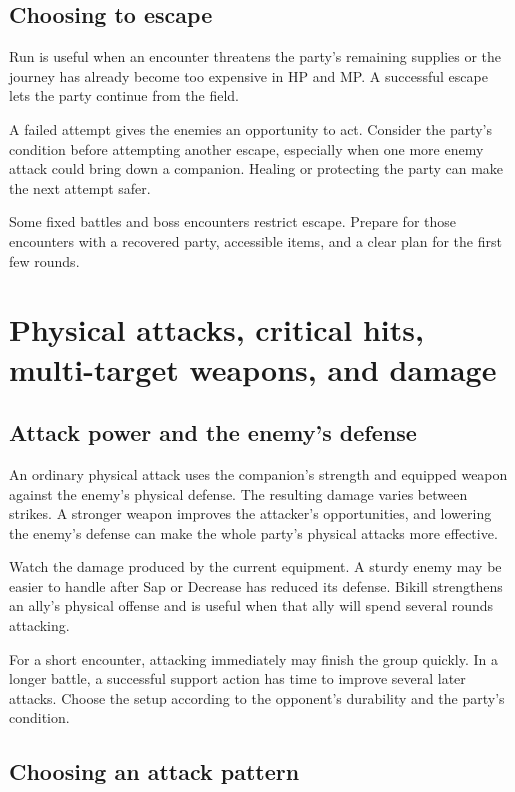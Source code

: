 \subsection*{Choosing to escape}

Run is useful when an encounter threatens the party's remaining supplies
or the journey has already become too expensive in HP and MP. A successful
escape lets the party continue from the field.

A failed attempt gives the enemies an opportunity to act. Consider the
party's condition before attempting another escape, especially when one
more enemy attack could bring down a companion. Healing or protecting the
party can make the next attempt safer.

Some fixed battles and boss encounters restrict escape. Prepare for those
encounters with a recovered party, accessible items, and a clear plan for
the first few rounds.

\section{Physical attacks, critical hits, multi-target weapons, and damage}

\subsection*{Attack power and the enemy's defense}

An ordinary physical attack uses the companion's strength and equipped
weapon against the enemy's physical defense. The resulting damage varies
between strikes. A stronger weapon improves the attacker's opportunities,
and lowering the enemy's defense can make the whole party's physical
attacks more effective.

Watch the damage produced by the current equipment. A sturdy enemy may
be easier to handle after Sap or Decrease has reduced its defense. Bikill
strengthens an ally's physical offense and is useful when that ally will
spend several rounds attacking.

For a short encounter, attacking immediately may finish the group quickly.
In a longer battle, a successful support action has time to improve several
later attacks. Choose the setup according to the opponent's durability
and the party's condition.

\subsection*{Choosing an attack pattern}

